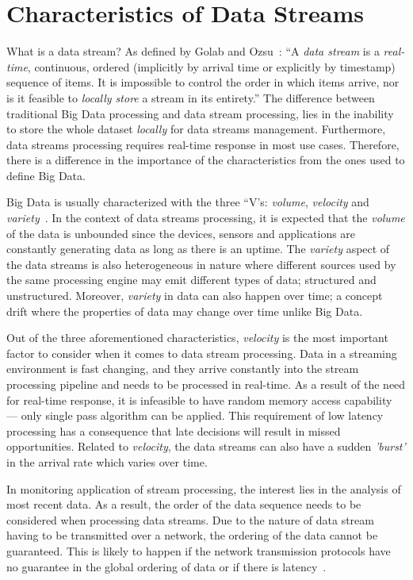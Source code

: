 \section{Characteristics of Data Streams}
\label{sec:characteristics_data_stream}
What is a data stream? As defined by Golab and Ozsu~\cite{golab_data_stream}:
“A \emph{data stream} is a \emph{real-time}, continuous, ordered (implicitly by arrival time 
or explicitly by timestamp) sequence of items. It is impossible to control the order
in which items arrive, nor is it feasible to \emph{locally store} a stream in its entirety.”
The difference between traditional Big Data processing and data stream processing, lies in 
the inability to store the whole dataset \emph{locally} for data streams management. Furthermore, 
data streams processing requires real-time response in most use cases. Therefore, there is a 
difference in the importance of the characteristics from the ones used to define Big Data. 

Big Data is usually characterized with the three “V's: \emph{volume}, \emph{velocity} 
and \emph{variety}~\cite{big_data_analytics}. 
In the context of data streams processing, it is expected that the \emph{volume} of 
the data is unbounded since the devices, sensors and applications are constantly 
generating data as long as there is an uptime. The \emph{variety} aspect of the 
data streams is also heterogeneous in nature where different sources used by the same 
processing engine may emit different types of data; structured and unstructured. 
Moreover, \emph{variety} in data can also happen over time; a concept drift where 
the properties of data may change over time unlike Big Data. 

Out of the three aforementioned characteristics, \emph{velocity} is the most important 
factor to consider when it comes to data stream processing. Data in a streaming 
environment is fast changing, and they arrive constantly into the stream processing
pipeline and needs to be processed in real-time. As a result of the need for real-time 
response, it is infeasible to have random memory access capability --- only single pass algorithm can
be applied. This requirement of low latency processing has a consequence 
that late decisions will result in missed opportunities. Related to \emph{velocity}, 
the data streams can also have a sudden \emph{'burst'} in the arrival rate which varies 
over time. 

In monitoring application of stream processing, the interest lies in the analysis of 
most recent data. As a result, the order of the data sequence needs to be considered 
when processing data streams. Due to the nature of data stream having to be transmitted over a 
network, the ordering of the data cannot be guaranteed. This is 
likely to happen if the network transmission protocols have no guarantee in the global 
ordering of data or if there is latency~\cite{requirements_dsp}. 

